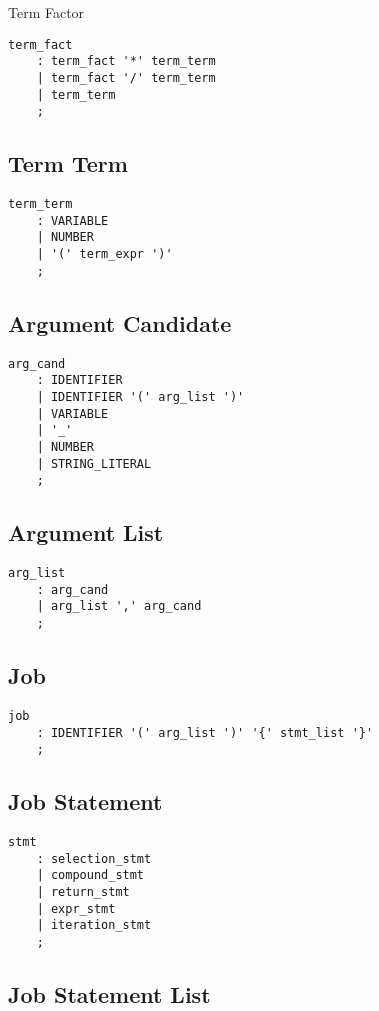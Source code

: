 \documentclass[prodmode,acmtecs]{acmsmall}
\begin{document}
Term Factor
\begin{lstlisting}
term_fact
	: term_fact '*' term_term
	| term_fact '/' term_term
	| term_term
	;
\end{lstlisting}


\subsection{Term Term}

\begin{lstlisting}
term_term
	: VARIABLE
	| NUMBER
	| '(' term_expr ')'
	;
\end{lstlisting}


\subsection{Argument Candidate}

\begin{lstlisting}
arg_cand
	: IDENTIFIER
	| IDENTIFIER '(' arg_list ')'
	| VARIABLE
	| '_'
	| NUMBER
	| STRING_LITERAL
	;
\end{lstlisting}


\subsection{Argument List}

\begin{lstlisting}
arg_list
	: arg_cand
	| arg_list ',' arg_cand
	;
\end{lstlisting}

\subsection{Job}

\begin{lstlisting}
job
	: IDENTIFIER '(' arg_list ')' '{' stmt_list '}'
	;
\end{lstlisting}


\subsection{Job Statement}

\begin{lstlisting}
stmt
	: selection_stmt
	| compound_stmt
	| return_stmt
	| expr_stmt
	| iteration_stmt
	;
\end{lstlisting}


\subsection{Job Statement List}
\end{document}

